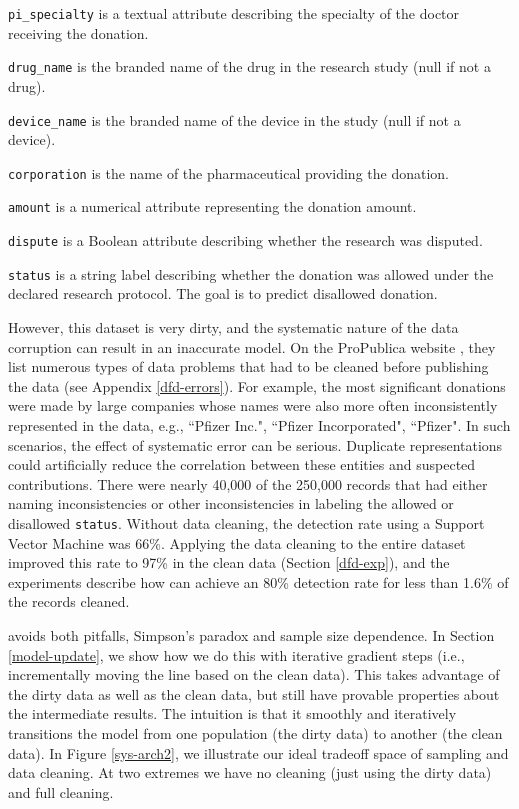 \noindent\texttt{pi\_specialty} is a textual attribute describing the specialty of the doctor receiving the donation.

\noindent\texttt{drug\_name} is the branded name of the drug in the research study (null if not a drug).

\noindent\texttt{device\_name} is the branded name of the device in the study (null if not a device).

\noindent\texttt{corporation} is the name of the pharmaceutical providing the donation.

\noindent\texttt{amount} is a numerical attribute representing the donation amount.

\noindent\texttt{dispute} is a Boolean attribute describing whether the research was disputed.

\noindent\texttt{status} is a string label describing whether the  donation was allowed under the declared research protocol. The goal is to predict disallowed  donation. 

\vspace{0.5em}

However, this dataset is very dirty, and the systematic nature of the data corruption can result in an inaccurate model.
On the ProPublica website \cite{dollarsfordocs}, they list numerous types of data problems that had to be cleaned before publishing the data (see Appendix \ref{dfd-errors}).
For example, the most significant donations were made by large companies whose names were also more often inconsistently represented in the data, e.g., ``Pfizer Inc.", ``Pfizer Incorporated", ``Pfizer".
In such scenarios, the effect of systematic error can be serious.
Duplicate representations could artificially reduce the correlation between these entities and suspected contributions.
There were nearly 40,000 of the 250,000 records that had either naming inconsistencies or other inconsistencies in labeling the allowed or disallowed \texttt{status}.
Without data cleaning, the detection rate using a Support Vector Machine was 66\%.
Applying the data cleaning to the entire dataset improved this rate to 97\% in the clean data (Section \ref{dfd-exp}), and the experiments describe how \sys can achieve an 80\% detection rate for less than 1.6\% of the records cleaned.



\iffalse
\sys avoids both pitfalls, Simpson's paradox and sample size dependence.
In Section \ref{model-update}, we show how we do this with iterative gradient steps (i.e., incrementally moving the line based on the clean data).
This takes advantage of the dirty data as well as the clean data, but still have provable properties about the intermediate results.
The intuition is that it smoothly and iteratively transitions the model from one population (the dirty data) to another (the clean data).
In Figure \ref{sys-arch2}, we illustrate our ideal tradeoff space of sampling and data cleaning.
At two extremes we have no cleaning (just using the dirty data) and full cleaning.

